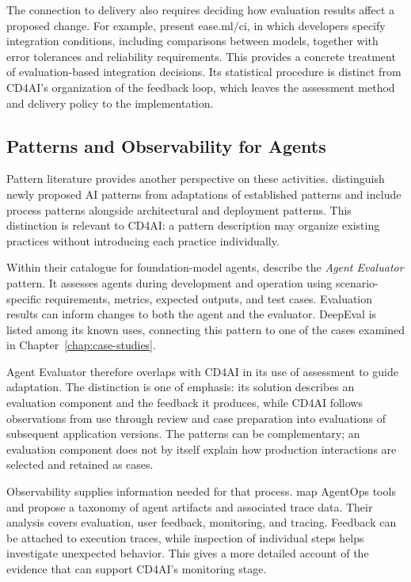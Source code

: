 The connection to delivery also requires deciding how evaluation results affect
a proposed change. For example, \textcite{Renggli:EaseMLCI:2019} present
ease.ml/ci, in which developers specify integration conditions, including
comparisons between models, together with error tolerances and reliability
requirements. This provides a concrete treatment of evaluation-based
integration decisions. Its statistical procedure is distinct from CD4AI's
organization of the feedback loop, which leaves the assessment method and
delivery policy to the implementation.

\subsection{Patterns and Observability for Agents}
\label{sec:related-agent-patterns}

Pattern literature provides another perspective on these activities.
\textcite{Heiland:AIPatterns:2023} distinguish newly proposed AI patterns from
adaptations of established patterns and include process patterns alongside
architectural and deployment patterns. This distinction is relevant to CD4AI:
a pattern description may organize existing practices without introducing
each practice individually.

Within their catalogue for foundation-model agents,
\textcite{Liu:AgentPatterns:2024} describe the \emph{Agent Evaluator} pattern.
It assesses agents during development and operation using scenario-specific
requirements, metrics, expected outputs, and test cases. Evaluation results
can inform changes to both the agent and the evaluator. DeepEval is listed
among its known uses, connecting this pattern to one of the cases examined in
Chapter~\ref{chap:case-studies}.

Agent Evaluator therefore overlaps with CD4AI in its use of assessment to guide
adaptation. The distinction is one of emphasis: its solution describes an
evaluation component and the feedback it produces, while CD4AI follows
observations from use through review and case preparation into evaluations of
subsequent application versions. The patterns can be complementary; an
evaluation component does not by itself explain how production interactions
are selected and retained as cases.

Observability supplies information needed for that process.
\textcite{Dong:AgentOps:2024} map AgentOps tools and propose a taxonomy of
agent artifacts and associated trace data. Their analysis covers evaluation,
user feedback, monitoring, and tracing. Feedback can be attached to execution
traces, while inspection of individual steps helps investigate unexpected
behavior. This gives a more detailed account of the evidence that can support
CD4AI's monitoring stage.

